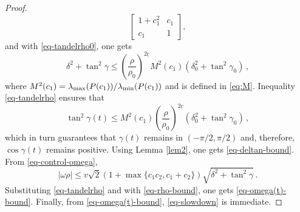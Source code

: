 \documentclass[letterpaper, 10 pt, conference]{ieeeconf}  %
\begin{document}
\begin{proof}
\begin{equation}
\begin{bmatrix}
1+c_1^2 &c_1\\c_1 &1
\end{bmatrix},
\end{equation}
and with \eqref{eq-tandelrho0}, one gets  
\begin{equation}
\label{eq-tandelrho}
\delta^2+\tan^2\gamma \leq \left(\frac{\rho}{\rho_0}\right)^{2\underline c} M^2(c_1)\left(\delta^2_0+\tan^2\gamma_0\right)\,,
\end{equation}
where $M^2(c_1) = \lambda_{\rm max}(P(c_1))/\lambda_{\rm min}(P(c_1))$ and is defined in \eqref{eq:M}. Inequality \eqref{eq-tandelrho} ensures that 
\begin{equation}
\tan^2\gamma(t) \leq M^2(c_1)\left(\frac{\rho}{\rho_0}\right)^{2\underline c} ( \delta^2_0+\tan^2\gamma_0)\,,
\end{equation}
which in turn guarantees that $\gamma(t)$ remains in $(-\pi/2,\pi/2)$ and, therefore, $\cos\gamma(t)$ remains positive. 
Using Lemma \ref{lem2}, one gets \eqref{eq-deltan-bound}. From \eqref{eq-control-omega}, 
\begin{equation}
|\omega\rho| \leq v\sqrt{2}(1+\max\{c_1c_2,c_1+c_2\})\sqrt{\delta^2+\tan^2\gamma}\,.
\end{equation}
Substituting \eqref{eq-tandelrho} and with \eqref{eq-rho-bound}, one gets 
\eqref{eq-omega(t)-bound}. Finally, from \eqref{eq-omega(t)-bound}, 
\eqref{eq-slowdown} is immediate. 
\end{proof}
\end{document}
